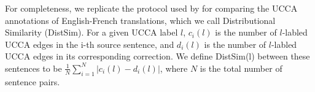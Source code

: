 \documentclass[letterpaper, 11pt]{article}
\begin{document}
For completeness, we  replicate the protocol used by 
for comparing the UCCA annotations of English-French translations, which we call
Distributional Similarity ({\sc DistSim}).
For a given UCCA label $l$, $c_i(l)$ is the number of $l$-labled UCCA edges
in the i-th source sentence, and $d_i(l)$ is the number of $l$-labled UCCA edges
in its corresponding correction. We define {\sc DistSim}(l) between these
sentences to be $\frac{1}{N}\sum_{i=1}^N \vert c_i(l) - d_i(l) \vert$, where
$N$ is the total number of sentence pairs.
%
%
%
%
\end{document}
